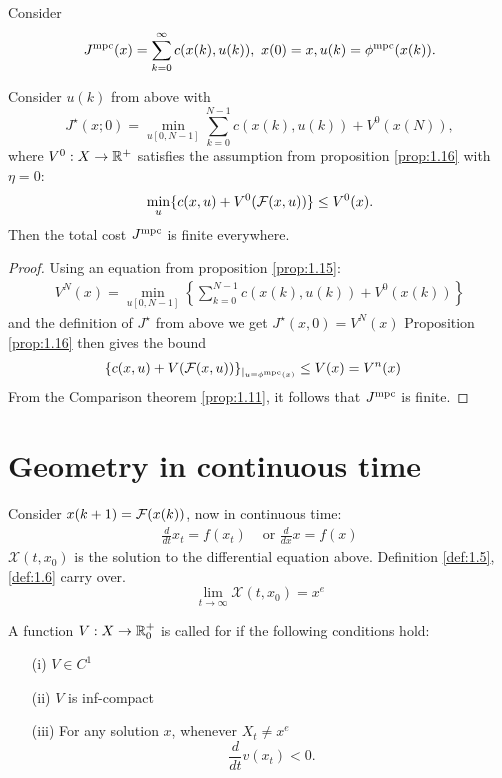 Consider 
\[J{^{\text{mpc}}}(x)=\sum_{k=0}^\infty c(x(k),u(k)),\ x(0)=x,u(k)=\phi{^{\text{mpc}}}(x(k)).\]

\begin{proposition}\label{prop:1.19}
    Consider \(u(k)\) from above with 
    \[J^\star(x;0)=\min_{u[0,N-1]}\sum_{k=0}^{N-1}c(x(k),u(k))+V^0(x(N)),\]
    where \(V^0:X\to\mathbb{R}^+\) satisfies the assumption from proposition \ref{prop:1.16}
    with \(\eta=0\):
    \[\min_{u}\{c(x,u)+V^0(\mathcal{F}(x,u))\}\leq V^0(x).\]
    Then the total cost \(J{^{\text{mpc}}}\) is finite everywhere.
\end{proposition}

\begin{proof}
    Using an equation from proposition \ref{prop:1.15}:
    \begin{align*}
        V^N(x)=\min_{u[0,N-1]}\left\{\sum_{k=0}^{N-1}c(x(k),u(k))+V^0(x(k))\right\}
    \end{align*}
    and the definition of \(J^\star\) from above we get \(J^\star(x,0)=V^N(x)\) 
    Proposition \ref{prop:1.16} then gives the bound
    \begin{align*}
        \{c(x,u)+V(\mathcal{F}(x,u))\}_{|_{u=\phi{^{\text{mpc}}}(x)}}&\leq V(x)=V^n(x)        
    \end{align*}
    From the Comparison theorem \ref{prop:1.11}, it follows that \(J{^{\text{mpc}}}\) is finite.
\end{proof}

\section{Geometry in continuous time}

Consider \(x(k+1)=\mathcal{F}(x(k))\), now in continuous time:
\begin{align*}
    \frac{d}{dt}x_t=f(x_t) & \text{ or } \frac{d}{dx} x=f(x)
\end{align*}
\(\mathcal{X}(t,x_0)\) is the solution to the differential equation above.
Definition \ref{def:1.5}, \ref{def:1.6} carry over.
\[\lim_{t\to\infty} \mathcal{X}(t,x_0)=x^e\]
\begin{definition}\label{def:1.20}
    A function \(V:X\to\mathbb{R}_0^+\) is called  for 
     if the following  conditions hold:
    \begin{itemize}
        \item[(i)] \(V\in C^1\)
        \item[(ii)] \(V\) is inf-compact
        \item[(iii)] For any solution \(x\), whenever \(X_t\neq x^e\) \[\frac{d}{dt}v(x_t)<0.\]   
    \end{itemize}
\end{definition}

